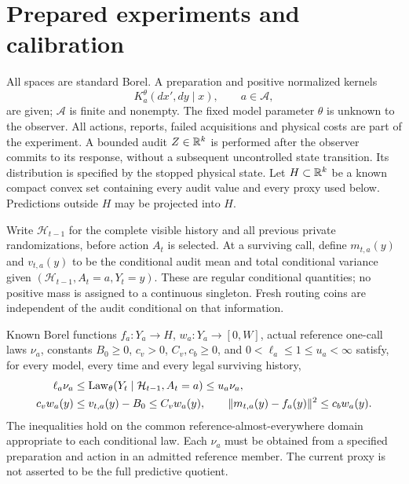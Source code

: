 \section{Prepared experiments and calibration}
\label{sec:experiment}
All spaces are standard Borel. A preparation and positive normalized kernels
\[
 K_a^\theta(dx',dy\mid x),\qquad a\in\mathcal A,
\]
are given; $\mathcal A$ is finite and nonempty. The fixed model parameter $\theta$ is unknown to the observer. All actions, reports, failed acquisitions and physical costs are part of the experiment. A bounded audit $Z\in\mathbb R^k$ is performed after the observer commits to its response, without a subsequent uncontrolled state transition. Its distribution is specified by the stopped physical state. Let $H\subset\mathbb R^k$ be a known compact convex set containing every audit value and every proxy used below. Predictions outside $H$ may be projected into $H$.

Write $\mathcal H_{t-1}$ for the complete visible history and all previous private randomizations, before action $A_t$ is selected. At a surviving call, define $m_{t,a}(y)$ and $v_{t,a}(y)$ to be the conditional audit mean and total conditional variance given $(\mathcal H_{t-1},A_t=a,Y_t=y)$. These are regular conditional quantities; no positive mass is assigned to a continuous singleton. Fresh routing coins are independent of the audit conditional on that information.

\begin{definition}\label{def:certificate}
Known Borel functions $f_a:Y_a\to H$, $w_a:Y_a\to[0,W]$, actual reference one-call laws $\nu_a$, constants $B_0\ge0$, $c_v>0$, $C_v,c_b\ge0$, and $0<\ell_a\le1\le u_a<\infty$ satisfy, for every model, every time and every legal surviving history,
\begin{align}
 \ell_a\nu_a&\le\operatorname{Law}_\theta(Y_t\mid\mathcal H_{t-1},A_t=a)\le u_a\nu_a,
 \label{eq:report-envelope}\\
 c_vw_a(y)&\le v_{t,a}(y)-B_0\le C_vw_a(y),\qquad
 \|m_{t,a}(y)-f_a(y)\|^2\le c_bw_a(y).
 \label{eq:calibration}
\end{align}
The inequalities hold on the common reference-almost-everywhere domain appropriate to each conditional law. Each $\nu_a$ must be obtained from a specified preparation and action in an admitted reference member. The current proxy is not asserted to be the full predictive quotient.
\end{definition}

